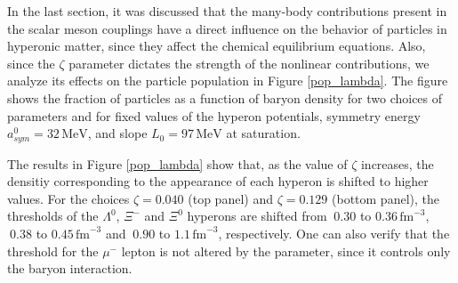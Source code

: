 \documentclass[twocolumn,showpacs,aps]{revtex4}
\begin{document}
\begin{table}[t]
\begin{ruledtabular}
\begin{tabular}{ccccc}
  \end{tabular}
\end{ruledtabular}
\end{table}
  
In the last section, it was discussed that the many-body contributions present in the scalar meson 
couplings have a direct influence on the behavior of particles in hyperonic matter,
since they affect the chemical equilibrium equations. 
Also, since the $\zeta$ parameter dictates the strength of the nonlinear contributions, 
we analyze its effects on the particle population in Figure \ref{pop_lambda}.
The figure shows the fraction of particles as a function of baryon density for
two choices of parameters and for fixed values of the hyperon potentials, 
symmetry energy $a^0_{sym}=32\, \mathrm{MeV}$, and slope $L_{0}=97\, \mathrm{MeV}$
  at saturation.   

The results in Figure \ref{pop_lambda} show that, as the value of $\zeta$ increases, the densitiy corresponding to 
the appearance of each hyperon is shifted to higher values.
For the choices $\zeta=0.040$ (top panel) and $\zeta=0.129$ (bottom panel), the thresholds of the $\Lambda^0$, $\Xi^-$ and $\Xi^0$ hyperons
are shifted from $~0.30$ to $0.36\,\mathrm{fm}^{-3}$, $~0.38$ to $0.45\,\mathrm{fm}^{-3}$
  and $~0.90$ to $1.1\,\mathrm{fm}^{-3}$, respectively.
One can also verify that the threshold for the $\mu^-$ lepton is not altered by the parameter,
since it controls only the baryon interaction.
\end{document}

